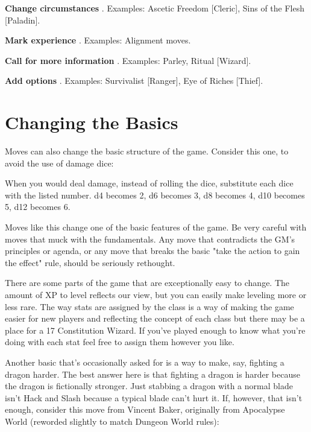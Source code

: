          
\item            {\bf Change circumstances} . Examples: Ascetic Freedom [Cleric], Sins of the Flesh [Paladin].

         
\item            {\bf Mark experience} . Examples: Alignment moves.

         
\item            {\bf Call for more information} . Examples: Parley, Ritual [Wizard].

         
\item            {\bf Add options} . Examples: Survivalist [Ranger], Eye of Riches [Thief].

       
\stopitemize
       
\section{Changing the Basics}   
       

Moves can also change the basic structure of the game. Consider this one, to avoid the use of damage dice:

       
\startExample
When you would deal damage, instead of rolling the dice, substitute each dice with the listed number. d4 becomes 2, d6 becomes 3, d8 becomes 4, d10 becomes 5, d12 becomes 6.
\stopExample
       

Moves like this change one of the basic features of the game. Be very careful with moves that muck with the fundamentals. Any move that contradicts the GM's principles or agenda, or any move that breaks the basic "take the action to gain the effect" rule, should be seriously rethought.

       

There are some parts of the game that are exceptionally easy to change. The amount of XP to level reflects our view, but you can easily make leveling more or less rare. The way stats are assigned by the class is a way of making the game easier for new players and reflecting the concept of each class but there may be a place for a 17 Constitution Wizard. If you've played enough to know what you're doing with each stat feel free to assign them however you like.

       

Another basic that's occasionally asked for is a way to make, say, fighting a dragon harder. The best answer here is that fighting a dragon is harder because the dragon is fictionally stronger. Just stabbing a dragon with a normal blade isn't Hack and Slash because a typical blade can't hurt it. If, however, that isn't enough, consider this move from Vincent Baker, originally from Apocalypse World (reworded slightly to match Dungeon World rules):

